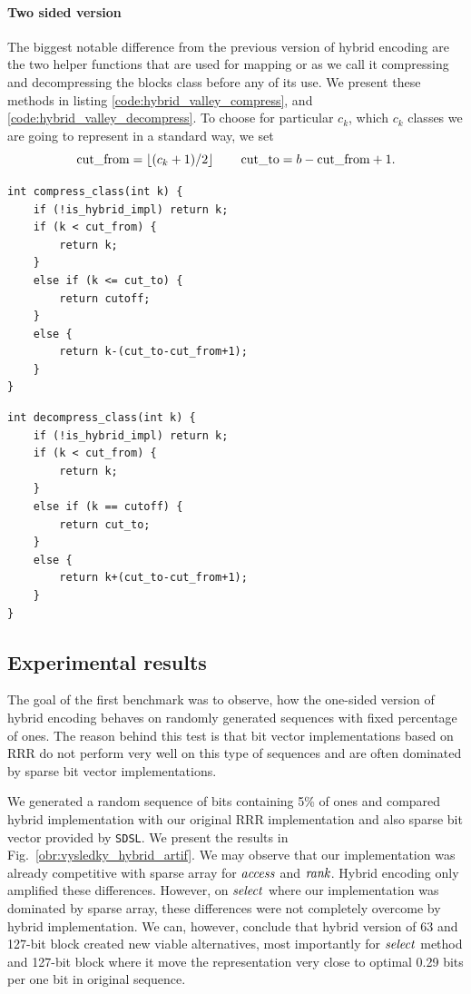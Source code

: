 \paragraph{Two sided version}

The biggest notable difference from the previous version of hybrid encoding are the two
helper functions that are used for mapping or as we call it compressing and decompressing
the blocks class before any of its use. We present these methods in listing \ref{code:hybrid_valley_compress},
and \ref{code:hybrid_valley_decompress}. To choose for particular $c_k$, which $c_k$ classes we are
going to represent in a standard way, we set
$$\text{cut\_from} = \left\lfloor (c_k+1)/2 \right\rfloor\qquad \text{cut\_to} = b-\text{cut\_from}+1.$$

\begin{lstlisting}
int compress_class(int k) {
	if (!is_hybrid_impl) return k;
	if (k < cut_from) {
		return k;
	}
	else if (k <= cut_to) {
		return cutoff;
	}
	else {
		return k-(cut_to-cut_from+1);
	}
}
\end{lstlisting}

\begin{lstlisting}
int decompress_class(int k) {
	if (!is_hybrid_impl) return k;
	if (k < cut_from) {
		return k;
	}
	else if (k == cutoff) {
		return cut_to;
	}
	else {
		return k+(cut_to-cut_from+1);
	}
}
\end{lstlisting}

\subsection{Experimental results}

The goal of the first benchmark was to observe, how the one-sided version of hybrid encoding
behaves on randomly generated sequences with fixed percentage of ones. The reason behind this
test is that bit vector implementations based on RRR do not perform very well on this type of
sequences and are often dominated by sparse bit vector implementations.

We generated a random sequence of bits containing 5\% of ones and compared hybrid implementation
with our original RRR implementation and also sparse bit vector provided by \texttt{SDSL}. We
present the results in Fig.~\ref{obr:vysledky_hybrid_artif}. We may observe that our implementation
was already competitive with sparse array for $\mathit{access}$ and $\mathit{rank}$. Hybrid encoding only amplified
these differences. However, on $\mathit{select}$ where our implementation was dominated by sparse array,
these differences were not completely overcome by hybrid implementation. We can, however, conclude
that hybrid version of 63 and 127-bit block created new viable alternatives, most importantly for
$\mathit{select}$ method and 127-bit block where it move the representation very close to optimal 0.29
bits per one bit in original sequence.

